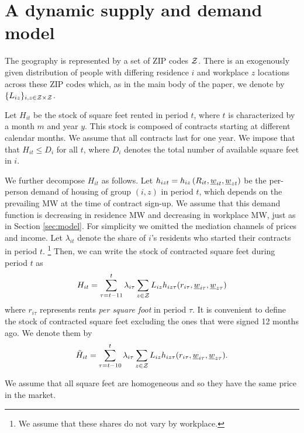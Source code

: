 
\section{A dynamic supply and demand model}\label{sec:dyn_theory_model}

The geography is represented by a set of ZIP codes $\mathcal{Z}$.
There is an exogenously given distribution of people with differing 
residence $i$ and 
workplace $z$ locations across these ZIP codes which,
as in the main body of the paper, we denote by $\{L_{iz}\}_{i,z\in\mathcal{Z}\times\mathcal{Z}}$.

Let $H_{it}$ be the stock of square feet rented in period $t$, where $t$ is 
characterized by a month $m$ and year $y$.
This stock is composed of contracts starting at different calendar months. 
We assume that all contracts last for one year.
We impose that that $H_{it} \leq D_i$ for all $t$, 
where $D_i$ denotes the total number of available square feet in $i$.

We further decompose $H_{it}$ as follows.
Let $h_{izt} = h_{iz}\left(R_{it}, \underline{w}_{it}, \underline{w}_{zt}\right)$ be the 
per-person demand of housing of group $(i,z)$ in period $t$,
which depends on the prevailing MW at the time of contract sign-up.
We assume that this demand function is decreasing in residence MW and decreasing
in workplace MW, just as in Section \ref{sec:model}.
For simplicity we omitted the mediation channels of prices and income.
Let $\lambda_{it}$ denote the share of $i$'s residents who started their contracts 
in period $t$.%
\footnote{We assume that these shares do not vary by workplace.}
Then, we can write the stock of contracted square feet during period $t$ as
$$
H_{it} = \sum_{\tau = t - 11}^{t} \lambda_{i\tau} \sum_{z\in\mathcal{Z}} L_{iz} 
h_{iz\tau} (r_{i\tau}, \underline{w}_{i\tau}, \underline{w}_{z\tau})
$$
where 
$r_{i\tau}$ represents rents \textit{per square foot} in period $\tau$.
It is convenient to define the stock of contracted square feet excluding the ones 
that were signed 12 months ago. We denote them by
$$
\tilde H_{it} = \sum_{\tau = t - 10}^{t} \lambda_{i\tau} \sum_{z\in\mathcal{Z}} L_{iz} 
h_{iz\tau} (r_{i\tau}, \underline{w}_{i\tau}, \underline{w}_{z\tau}) .
$$

We assume that all square feet are homogeneous and so they have the same price in 
the market.

